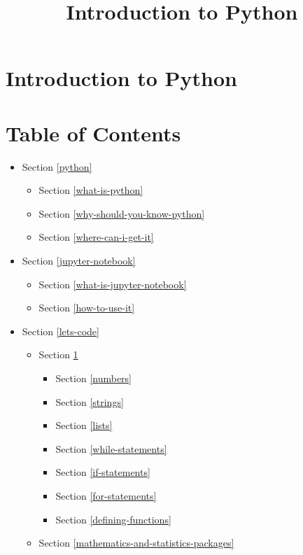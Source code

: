 \documentclass[11pt]{article}
\title{Introduction to Python}
\providecommand{\tightlist}{%
      \setlength{\itemsep}{0pt}\setlength{\parskip}{0pt}}
\begin{document}
    
    
    \maketitle
    
    

    
    \section{Introduction to Python}\label{introduction-to-python}

    \section{Table of Contents}\label{table-of-contents}

\begin{itemize}
\item
  Section \ref{python}

  \begin{itemize}
  \tightlist
  \item
    Section \ref{what-is-python}
  \item
    Section \ref{why-should-you-know-python}
  \item
    Section \ref{where-can-i-get-it}
  \end{itemize}
\item
  Section \ref{jupyter-notebook}

  \begin{itemize}
  \tightlist
  \item
    Section \ref{what-is-jupyter-notebook}
  \item
    Section \ref{how-to-use-it}
  \end{itemize}
\item
  Section \ref{lets-code}

  \begin{itemize}
  \tightlist
  \item
    Section \ref{introduction-to-python}

    \begin{itemize}
    \tightlist
    \item
      Section \ref{numbers}
    \item
      Section \ref{strings}
    \item
      Section \ref{lists}
    \item
      Section \ref{while-statements}
    \item
      Section \ref{if-statements}
    \item
      Section \ref{for-statements}
    \item
      Section \ref{defining-functions}
    \end{itemize}
  \item
    Section \ref{mathematics-and-statistics-packages}


\end{itemize}
\end{itemize}
\end{document}
